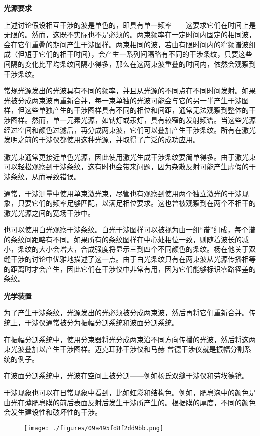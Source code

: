 \textbf{光源要求}

上述讨论假设相互干涉的波是单色的，即具有单一频率——这要求它们在时间上是无限的。然而，这既不实际也不是必须的。两束频率在一定时间内固定的相同波，会在它们重叠的期间产生干涉图样。两束相同的波，若由有限时间内的窄频谱波组成（但短于它们的相干时间），会产生一系列间隔略有不同的干涉条纹，只要这些间隔的变化比平均条纹间隔小得多，那么在这两束波重叠的时间内，依然会观察到干涉条纹。

常规光源发出的光波具有不同的频率，并且从光源的不同点在不同时间发射。如果光被分成两束波再重新合并，每一束单独的光波可能会与它的另一半产生干涉图样，但这些单独产生的干涉图样具有不同的相位和间距，通常无法观察到整体的干涉图样。然而，单一元素光源，如钠灯或汞灯，具有较窄的发射频谱。当这些光源经过空间和颜色过滤后，再分成两束波，它们可以叠加产生干涉条纹。所有在激光发明之前的干涉仪都使用这种光源，并取得了广泛的成功应用。

激光束通常更接近单色光源，因此使用激光生成干涉条纹要简单得多。由于激光束可以轻松观察到干涉条纹，这有时也会带来问题，因为杂散反射可能产生虚假的干涉条纹，从而导致错误。

通常，干涉测量中使用单束激光束，尽管也有观察到使用两个独立激光的干涉现象，只要它们的频率足够匹配，以满足相位要求。这也曾被观察到在两个不相干的激光光源之间的宽场干涉中。

也可以使用白光观察干涉条纹。白光干涉图样可以被视为由一组“谱”组成，每个谱的条纹间距略有不同。如果所有的条纹图样在中心处相位一致，则随着波长的减小，条纹的大小会增大，合成强度将显示三到四个不同颜色的条纹。杨在他关于双缝干涉的讨论中优雅地描述了这一点。由于白光条纹只有在两束波从光源传播相等的距离时才会产生，因此它们在干涉仪中非常有用，因为它们能够标识零路径差的条纹。

\textbf{光学装置}

为了产生干涉条纹，光源发出的光必须被分成两束波，然后再将它们重新合并。传统上，干涉仪通常被分为振幅分割系统和波面分割系统。

在振幅分割系统中，使用分束器将光分成两束沿不同方向传播的光波，然后将这两束光波叠加以产生干涉图样。迈克耳孙干涉仪和马赫-曾德干涉仪就是振幅分割系统的例子。

在波面分割系统中，光波在空间上被分割——例如杨氏双缝干涉仪和劳埃德镜。

干涉现象也可以在日常现象中看到，比如虹彩和结构色。例如，肥皂泡中的颜色是由光在薄肥皂膜的前后表面反射后发生干涉所产生的。根据膜的厚度，不同的颜色会发生建设性和破坏性的干涉。
\begin{figure}[ht]
\centering
\texttt{[image: ./figures/09a495fd8f2dd9bb.png]}
\caption{} \label{fig_GSWLX_10}
\end{figure}
